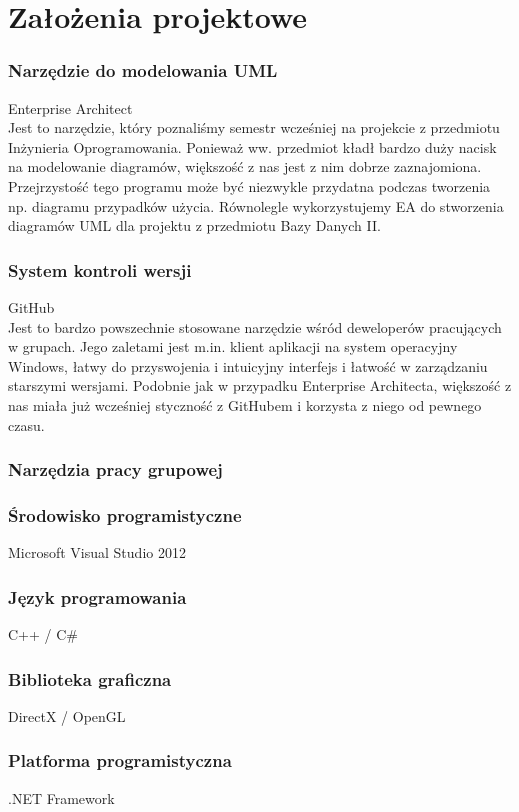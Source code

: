 \documentclass[a4paper,twoside]{article}
\begin{document}


\newpage

\part{\huge \textbf{Założenia projektowe}}

\section{Narzędzie do modelowania UML}

{\Large Enterprise Architect} \\
Jest to narzędzie, który poznaliśmy semestr wcześniej na projekcie z przedmiotu Inżynieria Oprogramowania. Ponieważ ww. przedmiot kładł bardzo duży nacisk na modelowanie diagramów, większość z nas jest z nim dobrze zaznajomiona. Przejrzystość tego programu może być niezwykle przydatna podczas tworzenia np. diagramu przypadków użycia. Równolegle wykorzystujemy EA do stworzenia diagramów UML dla projektu z przedmiotu Bazy Danych II.

\section{System kontroli wersji}

{\Large GitHub} \\
Jest to bardzo powszechnie stosowane narzędzie wśród deweloperów pracujących w grupach. Jego zaletami jest m.in. klient aplikacji na system operacyjny Windows, łatwy do przyswojenia i intuicyjny interfejs i łatwość w zarządzaniu starszymi wersjami. Podobnie jak w przypadku Enterprise Architecta, większość z nas miała już wcześniej styczność z GitHubem i korzysta z niego od pewnego czasu.

\section{Narzędzia pracy grupowej}
\section{Środowisko programistyczne}
{\Large Microsoft Visual Studio 2012}
\section{Język programowania}
{\Large C++ / C\#}
\section{Biblioteka graficzna}
{\Large DirectX / OpenGL}
\section{Platforma programistyczna}
{\Large .NET Framework}
\end{document}
